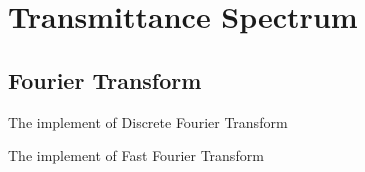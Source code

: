 \section{Transmittance Spectrum}
\subsection{Fourier Transform}
The implement of Discrete Fourier Transform

The implement of Fast Fourier Transform
